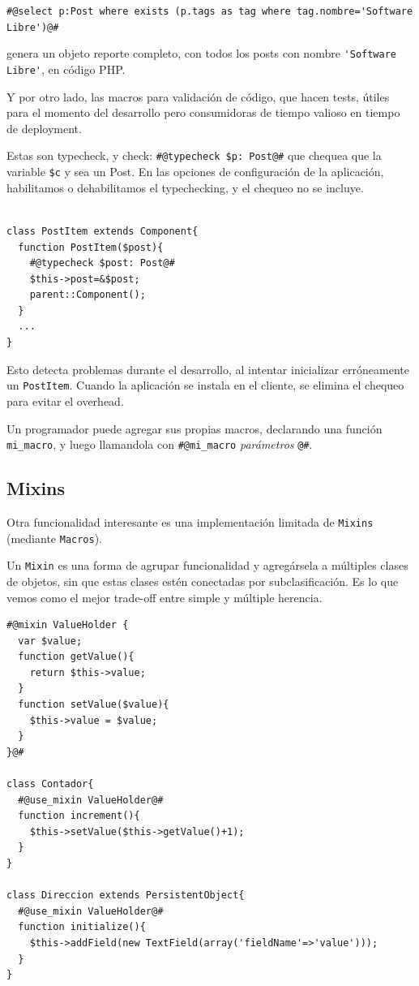 \verb"#@select p:Post where exists (p.tags as tag where tag.nombre='Software Libre')@#"%

genera un objeto reporte completo, con todos los posts con nombre \verb"'Software Libre'", en código PHP.

Y por otro lado, las macros para validación de código, que hacen tests, útiles para el momento del desarrollo pero consumidoras de tiempo valioso en tiempo de deployment.

Estas son typecheck, y check:
\verb"#@typecheck $p: Post@#" %
que chequea que la variable \verb"$c" y %
 sea un Post. En las opciones de configuración de la aplicación, habilitamos o dehabilitamos el typechecking, y el chequeo no se incluye.
\begin{verbatim}

class PostItem extends Component{
  function PostItem($post){
    #@typecheck $post: Post@#
    $this->post=&$post;
    parent::Component();
  }
  ...
}
\end{verbatim}

Esto detecta problemas durante el desarrollo, al intentar inicializar erróneamente un \verb"PostItem". Cuando la aplicación se instala en el cliente, se elimina el chequeo para evitar el overhead.

Un programador puede agregar sus propias macros, declarando una función \verb"mi_macro", y luego llamandola con \verb"#@mi_macro" {\it parámetros} \verb"@#".

\subsection{Mixins}
\label{sub-mixins}
Otra funcionalidad interesante es una implementación limitada de \verb"Mixins" (mediante \verb"Macros").

Un \verb"Mixin" es una forma de agrupar funcionalidad y agregársela a múltiples clases de objetos, sin que estas clases estén conectadas por subclasificación. Es lo que vemos como el mejor trade-off entre simple y múltiple herencia.

\begin{verbatim}
#@mixin ValueHolder {
  var $value;
  function getValue(){
    return $this->value;
  }
  function setValue($value){
    $this->value = $value;
  }
}@#

class Contador{
  #@use_mixin ValueHolder@#
  function increment(){
    $this->setValue($this->getValue()+1);
  }
}

class Direccion extends PersistentObject{
  #@use_mixin ValueHolder@#
  function initialize(){
    $this->addField(new TextField(array('fieldName'=>'value')));
  }
}

\end{verbatim}


